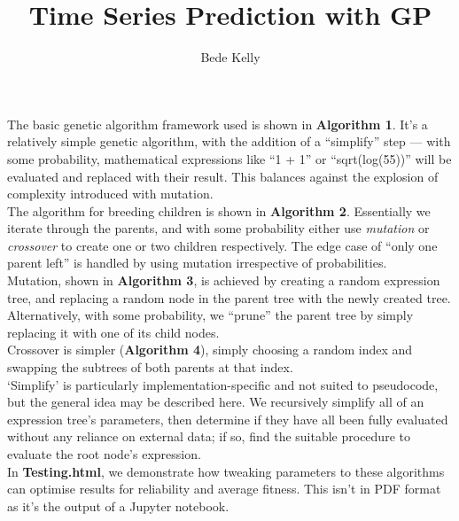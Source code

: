 \documentclass[11pt]{article}
\begin{document}
 \title{Time Series Prediction with GP}
 \author{Bede Kelly}
 \date{}
 \maketitle

The basic genetic algorithm framework used is shown in \textbf{Algorithm 1}. It's a relatively simple genetic algorithm, with the addition of a ``simplify'' step --- with some probability, mathematical expressions like ``1 + 1'' or ``sqrt(log(55))'' will be evaluated and replaced with their result. This balances against the explosion of complexity introduced with mutation.\\

The algorithm for breeding children is shown in \textbf{Algorithm 2}. Essentially we iterate through the parents, and with some probability either use \textit{mutation} or \textit{crossover} to create one or two children respectively. The edge case of ``only one parent left'' is handled by using mutation irrespective of probabilities.\\

Mutation, shown in \textbf{Algorithm 3}, is achieved by creating a random expression tree, and replacing a random node in the parent tree with the newly created tree. Alternatively, with some probability, we ``prune'' the parent tree by simply replacing it with one of its child nodes.\\

Crossover is simpler (\textbf{Algorithm 4}), simply choosing a random index and swapping the subtrees of both parents at that index.\\

`Simplify' is particularly implementation-specific and not suited to pseudocode, but the general idea may be described here. We recursively simplify all of an expression tree's parameters, then determine if they have all been fully evaluated without any reliance on external data; if so, find the suitable procedure to evaluate the root node's expression.\\

In \textbf{Testing.html}, we demonstrate how tweaking parameters to these algorithms can optimise results for reliability and average fitness. This isn't in PDF format as it's the output of a Jupyter notebook. 

\pagebreak
\end{document}

